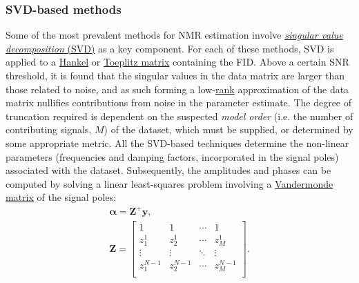\subsubsection{\acs{SVD}-based methods}
Some of the most prevalent methods for \ac{NMR} estimation involve
\ul{\emph{singular value decomposition} (SVD)}
as a key component. For each of these methods,
\ac{SVD} is applied to a \ul{Hankel} or \ul{Toeplitz matrix} containing the \ac{FID}.
Above a certain \ac{SNR} threshold, it is found that the singular values in the
data matrix are larger than those related to noise, and
as such forming a low-\ul{rank} approximation of the data matrix nullifies
contributions from noise in the parameter estimate. The degree of truncation
required is dependent on the suspected \emph{model order} (i.e. the number of
contributing signals, $M$) of the dataset, which must
be supplied, or determined by some appropriate metric. All the \ac{SVD}-based
techniques determine the non-linear parameters (frequencies and
damping factors, incorporated in the signal poles) associated with the dataset.
Subsequently, the amplitudes and phases can be computed by solving a linear
least-squares problem involving a \ul{Vandermonde matrix} of the signal poles:
\begin{subequations}
    \begin{gather}
        \symbf{\alpha} = \symbf{Z}^+ \symbf{y},\\
        \symbf{Z} = \begin{bmatrix}
            1 & 1 & \cdots & 1 \\
            z_1^1 & z_2^1 & \cdots & z_M^1\\
            \vdots & \vdots & \ddots & \vdots\\
            z_1^{N-1} & z_2^{N-1} & \cdots & z_M^{N-1}\\
            \end{bmatrix}.
    \end{gather}
    \label{eq:complex-amplitudes}
\end{subequations}

